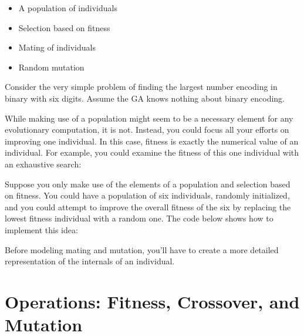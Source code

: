 \begin{itemize}
\item A population of individuals
\item Selection based on fitness
\item Mating of individuals
\item Random mutation
\end{itemize}
Consider the very simple problem of finding the largest number encoding
in binary with six digits. Assume the GA knows nothing about binary
encoding.

While making use of a population might seem to be a necessary element
for any evolutionary computation, it is not. Instead, you could focus
all your efforts on improving one individual. In this case, fitness is
exactly the numerical value of an individual. For example, you could
examine the fitness of this one individual with an exhaustive search:


Suppose you only make use of the elements of a population and selection
based on fitness. You could have a population of six individuals,
randomly initialized, and you could attempt to improve the overall
fitness of the six by replacing the lowest fitness individual with a
random one. The code below shows how to implement this idea:


Before modeling mating and mutation, you'll have to
create a more detailed representation of the internals of an
individual.

\section{Operations: Fitness, Crossover, and Mutation}

